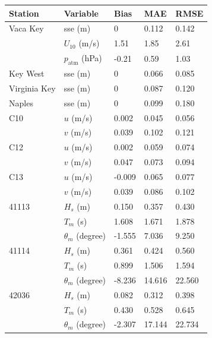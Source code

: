 \documentclass[preprint,12pt,authoryear]{elsarticle}
\begin{document}
\begin{table}
    \centering
    \begin{tabular}{|p{2.8cm}p{3cm}p{1.8cm}p{1.8cm}p{1.8cm}|}
        \hline
        \textbf{Station} & \textbf{Variable} & \textbf{Bias} & \textbf{MAE} & \textbf{RMSE} \\
        \hline
        Vaca Key     & sse (m)              & 0     & 0.112 & 0.142 \\
                     & $U_{10}$ (m/s)       & 1.51  & 1.85  & 2.61 \\
                     & $p_\text{atm}$ (hPa) & -0.21 & 0.59  & 1.03 \\ 
        Key West     & sse (m)              & 0     & 0.066 & 0.085 \\
        Virginia Key & sse (m)              & 0     & 0.087 & 0.120 \\
        Naples       & sse (m)              & 0     & 0.099 & 0.180 \\
        \hline
        C10   & $u$ (m/s)           &  0.002 &  0.045 &  0.056 \\
              & $v$ (m/s)           &  0.039 &  0.102 &  0.121 \\
        C12   & $u$ (m/s)           &  0.002 &  0.059 &  0.074 \\
              & $v$ (m/s)           &  0.047 &  0.073 &  0.094 \\
        C13   & $u$ (m/s)           & -0.009 &  0.065 &  0.077 \\
              & $v$ (m/s)           &  0.039 &  0.086 &  0.102 \\
        \hline
        41113 & $H_s$ (m)           &  0.150 &  0.357 &  0.430 \\
              & $T_m$ (s)           &  1.608 &  1.671 &  1.878 \\
              & $\theta_m$ (degree) & -1.555 &  7.036 &  9.250 \\
        41114 & $H_s$ (m)           &  0.361 &  0.424 &  0.560 \\
              & $T_m$ (s)           &  0.899 &  1.506 &  1.594 \\
              & $\theta_m$ (degree) & -8.236 & 14.616 & 22.560 \\
        42036 & $H_s$ (m)           &  0.082 &  0.312 &  0.398 \\
              & $T_m$ (s)           &  0.430 &  0.528 &  0.645 \\
              & $\theta_m$ (degree) & -2.307 & 17.144 & 22.734 \\

\end{tabular}
\end{table}
\end{document}
